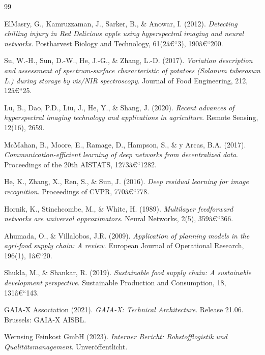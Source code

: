 ﻿\documentclass[12pt,a4paper]{article}
\theoremstyle{plain}
\theoremstyle{definition}
\begin{document}
	\begin{thebibliography}{99}
		
		ElMasry, G., Kamruzzaman, J., Sarker, B., \& Anowar, I. (2012).
		\textit{Detecting chilling injury in Red Delicious apple using
			hyperspectral imaging and neural networks}.
		Postharvest Biology and Technology, 61(2â€“3), 190â€“200.
		
		Su, W.-H., Sun, D.-W., He, J.-G., \& Zhang, L.-D. (2017).
		\textit{Variation description and assessment of spectrum-surface characteristic
			of potatoes (Solanum tuberosum L.) during storage by vis/NIR spectroscopy}.
		Journal of Food Engineering, 212, 12â€“25.
		
		Lu, B., Dao, P.D., Liu, J., He, Y., \& Shang, J. (2020).
		\textit{Recent advances of hyperspectral imaging technology and applications
			in agriculture}.
		Remote Sensing, 12(16), 2659.
		
		McMahan, B., Moore, E., Ramage, D., Hampson, S., \& y Arcas, B.A. (2017).
		\textit{Communication-efficient learning of deep networks from decentralized
			data}.
		Proceedings of the 20th AISTATS, 1273â€“1282.
		
		He, K., Zhang, X., Ren, S., \& Sun, J. (2016).
		\textit{Deep residual learning for image recognition}.
		Proceedings of CVPR, 770â€“778.
		
		Hornik, K., Stinchcombe, M., \& White, H. (1989).
		\textit{Multilayer feedforward networks are universal approximators}.
		Neural Networks, 2(5), 359â€“366.
		
		Ahumada, O., \& Villalobos, J.R. (2009).
		\textit{Application of planning models in the agri-food supply chain:
			A review}.
		European Journal of Operational Research, 196(1), 1â€“20.
		
		Shukla, M., \& Shankar, R. (2019).
		\textit{Sustainable food supply chain: A sustainable development perspective}.
		Sustainable Production and Consumption, 18, 131â€“143.
		
		GAIA-X Association (2021).
		\textit{GAIA-X: Technical Architecture}.
		Release 21.06. Brussels: GAIA-X AISBL.
		
		Wernsing Feinkost GmbH (2023).
		\textit{Interner Bericht: Rohstofflogistik und Qualitätsmanagement}.
		Unveröffentlicht.
		
	\end{thebibliography}
	
\end{document}
